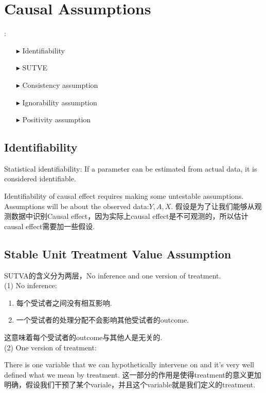 \newpage \section{Causal Assumptions} \label{Causal assumption}
:
\begin{itemize}
	\item[$\blacktriangleright$] Identifiability
	\item[$\blacktriangleright$] SUTVE 
	\item[$\blacktriangleright$] Consistency assumption
    \item[$\blacktriangleright$] Ignorability assumption
    \item[$\blacktriangleright$] Positivity assumption
\end{itemize}

\subsection{Identifiability}
Statistical identifiability: If a parameter can be estimated from actual data, it is considered identifiable.

{\color{red} Identifiability of causal effect} requires making some {\color{red} untestable} assumptions.
Assumptions will be about the observed data:$Y,A,X$.
假设是为了让我们能够从观测数据中识别Causal effect，因为实际上causal effect是不可观测的，所以估计causal effect需要加一些假设. 
\subsection{Stable Unit Treatment Value Assumption}
SUTVA的含义分为两层，No inference and one version of treatment.\\
\noindent (1) {\color{red} No inference:}
\begin{enumerate}[labelindent=2\parindent, leftmargin=*,align=left,widest=IV,label=\Roman*.]
	\item 每个受试者之间没有相互影响.
	\item 一个受试者的处理分配不会影响其他受试者的outcome. 
\end{enumerate}

这意味着每个受试者的outcome与其他人是无关的.\\

\noindent(2) {\color{red} One version of treatment:}

There is one variable that we can hypothetically intervene on and it's very well defined what we mean by treatment.
这一部分的作用是使得treatment的意义更加明确，假设我们干预了某个variale，并且这个variable就是我们定义的treatment.


